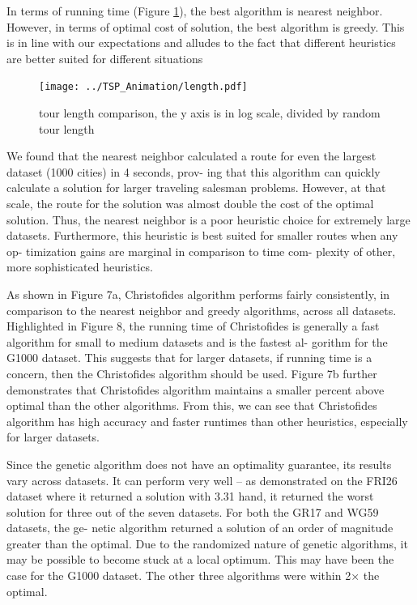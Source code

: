 \documentclass[10pt,twocolumn,letterpaper]{article}
\begin{document}
In terms of running time (Figure \ref{fig:length}), the best algorithm
is nearest neighbor. However, in terms of optimal cost of
solution, the best algorithm is greedy. This is in line with our
expectations and alludes to the fact that different heuristics
are better suited for different situations
\begin{figure}
	\centering
	\texttt{[image: ../TSP\_Animation/length.pdf]}
	\caption{tour length comparison, the y axis is in log scale, divided by random tour length}
	\label{fig:length}
\end{figure}
We found that the nearest neighbor calculated a route
for even the largest dataset (1000 cities) in 4 seconds, prov-
ing that this algorithm can quickly calculate a solution for
larger traveling salesman problems. However, at that scale,
the route for the solution was almost double the cost of
the optimal solution. Thus, the nearest neighbor is a poor
heuristic choice for extremely large datasets. Furthermore,
this heuristic is best suited for smaller routes when any op-
timization gains are marginal in comparison to time com-
plexity of other, more sophisticated heuristics.

As shown in Figure 7a, Christofides algorithm performs
fairly consistently, in comparison to the nearest neighbor
and greedy algorithms, across all datasets. Highlighted in
Figure 8, the running time of Christofides is generally a fast
algorithm for small to medium datasets and is the fastest al-
gorithm for the G1000 dataset. This suggests that for larger
datasets, if running time is a concern, then the Christofides
algorithm should be used. Figure 7b further demonstrates
that Christofides algorithm maintains a smaller percent above
optimal than the other algorithms. From this, we can see
that Christofides algorithm has high accuracy and faster
runtimes than other heuristics, especially for larger datasets.

Since the genetic algorithm does not have an optimality
guarantee, its results vary across datasets. It can perform
very well – as demonstrated on the FRI26 dataset where it
returned a solution with 3.31%
hand, it returned the worst solution for three out of the seven
datasets. For both the GR17 and WG59 datasets, the ge-
netic algorithm returned a solution of an order of magnitude
greater than the optimal. Due to the randomized nature of
genetic algorithms, it may be possible to become stuck at a
local optimum. This may have been the case for the G1000
dataset. The other three algorithms were within 2× the
optimal.
\end{document}
